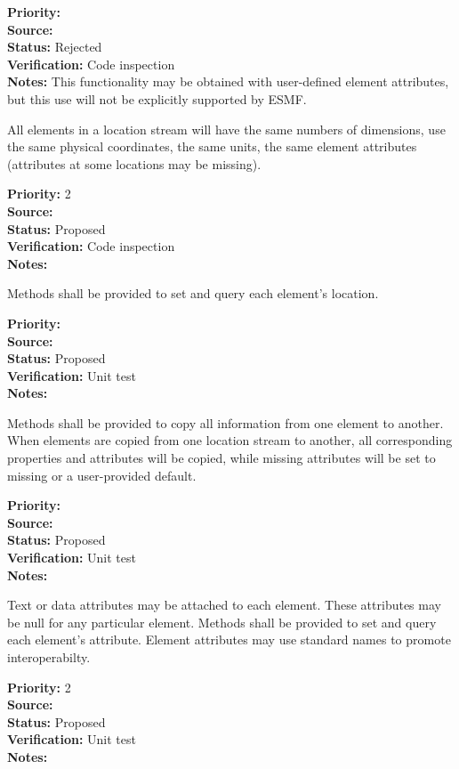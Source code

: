\begin{reqlist}
{\bf Priority:} \\
{\bf Source:} \\
{\bf Status:} Rejected \\
{\bf Verification:} Code inspection \\
{\bf Notes:} This functionality may be obtained with user-defined element
attributes, but this use will not be explicitly supported by ESMF.
\end{reqlist}


All elements in a location stream will have the same numbers of dimensions, use the
same physical coordinates, the same units, the same element attributes (attributes at
some locations may be missing).
\begin{reqlist}
{\bf Priority:} 2 \\
{\bf Source:} \\
{\bf Status:} Proposed \\
{\bf Verification:} Code inspection \\
{\bf Notes:} 
\end{reqlist}

Methods shall be provided to set and query each element's location.
\begin{reqlist}
{\bf Priority:} \\
{\bf Source:} \\
{\bf Status:} Proposed \\
{\bf Verification:} Unit test \\
{\bf Notes:} 
\end{reqlist}

Methods shall be provided to copy all information from one element to another. 
When elements are copied from one location stream to another, all corresponding
properties and attributes will be copied, while missing attributes will be
set to missing or a user-provided default.
\begin{reqlist}
{\bf Priority:} \\
{\bf Source:} \\
{\bf Status:} Proposed \\
{\bf Verification:} Unit test \\
{\bf Notes:} 
\end{reqlist}

Text or data attributes may be attached to each element.  These
attributes may be null for any particular element.  Methods shall be provided to set
and query each element's attribute.  Element attributes may use standard names to
promote interoperabilty.
\begin{reqlist}
{\bf Priority:} 2 \\
{\bf Source:} \\
{\bf Status:} Proposed \\
{\bf Verification:} Unit test \\
{\bf Notes:} 
\end{reqlist}

